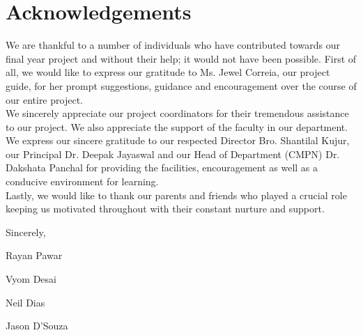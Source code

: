 \chapter*{Acknowledgements}
\pagestyle{fancy}
\fancyhf{}
\renewcommand{\headrulewidth}{0pt}
\cfoot{\thepage}
\onehalfspacing
\large {
\noindent
We are thankful to a number of individuals who have contributed towards our final year project and without their help; it would not have been possible. First of all, we would like to express our gratitude to Ms. Jewel Correia, our project guide, for her prompt suggestions, guidance and encouragement over the course of our entire project.\\

\noindent
We sincerely appreciate our project coordinators for their tremendous assistance to our project. We also appreciate the support of the faculty in our department.\\

\noindent
We express our sincere gratitude to our respected Director Bro. Shantilal Kujur, our Principal Dr. Deepak Jayaswal and our Head of Department (CMPN) Dr. Dakshata Panchal for providing the facilities, encouragement as well as a conducive environment for learning.\\

\noindent
Lastly, we would like to thank our parents and friends who played a crucial role keeping us motivated throughout with their constant nurture and support.}

\vspace{0.75cm}
\hspace{110.00mm}Sincerely,

\vspace{0.75cm}
\hspace{110.00mm}Rayan Pawar

\vspace{0.2cm}
\hspace{110.00mm}Vyom Desai

\vspace{0.2cm}
\hspace{110.00mm}Neil Dias

\vspace{0.2cm}
\hspace{110.00mm}Jason D'Souza
